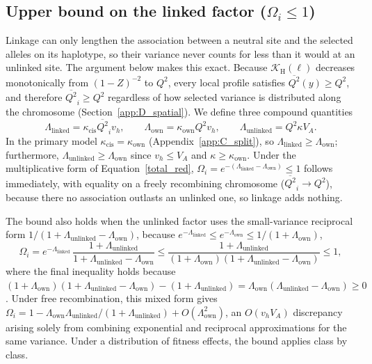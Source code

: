 \documentclass{article}
\begin{document}
\subsection{Upper bound on the linked factor (\texorpdfstring{$\Omega_i \le 1$}{Omega <= 1})}\label{app:omega}
Linkage can only lengthen the association between a neutral site and the selected alleles on its haplotype, so their variance never counts for less than it would at an unlinked site. The argument below makes this exact. Because $\mathcal{K}_\text{H}(\ell)$ decreases monotonically from $(1-Z)^{-2}$ to $Q^2$, every local profile satisfies $\overline{Q^2}(y) \ge Q^2$, and therefore $\overline{Q^2}_i \ge Q^2$ regardless of how selected variance is distributed along the chromosome (Section~\ref{app:D_spatial}). We define three compound quantities
\begin{equation}
    \Lambda_\text{linked} = \kappa_\text{cis}\overline{Q^2}_iv_h, \qquad \Lambda_\text{own} = \kappa_\text{own}Q^2v_h, \qquad \Lambda_\text{unlinked} = Q^2\kappa V_A.
\end{equation}
In the primary model $\kappa_\text{cis} = \kappa_\text{own}$ (Appendix~\ref{app:C_split}), so $\Lambda_\text{linked} \ge \Lambda_\text{own}$; furthermore, $\Lambda_\text{unlinked} \ge \Lambda_\text{own}$ since $v_h \le V_A$ and $\kappa \ge \kappa_\text{own}$. Under the multiplicative form of Equation~\eqref{total_red}, $\Omega_i = e^{-(\Lambda_\text{linked} - \Lambda_\text{own})} \le 1$ follows immediately, with equality on a freely recombining chromosome ($\overline{Q^2}_i \to Q^2$), because there no association outlasts an unlinked one, so linkage adds nothing.

The bound also holds when the unlinked factor uses the small-variance reciprocal form $1/(1 + \Lambda_\text{unlinked} - \Lambda_\text{own})$, because $e^{-\Lambda_\text{linked}} \le e^{-\Lambda_\text{own}} \le 1/(1+\Lambda_\text{own})$,
\begin{equation}
    \Omega_i = e^{-\Lambda_\text{linked}}\,\frac{1+\Lambda_\text{unlinked}}{1+\Lambda_\text{unlinked}-\Lambda_\text{own}} \le \frac{1+\Lambda_\text{unlinked}}{(1+\Lambda_\text{own})(1+\Lambda_\text{unlinked}-\Lambda_\text{own})} \le 1,
\end{equation}
where the final inequality holds because $(1+\Lambda_\text{own})(1+\Lambda_\text{unlinked}-\Lambda_\text{own}) - (1+\Lambda_\text{unlinked}) = \Lambda_\text{own}(\Lambda_\text{unlinked}-\Lambda_\text{own}) \ge 0$. Under free recombination, this mixed form gives $\Omega_i = 1 - \Lambda_\text{own}\Lambda_\text{unlinked}/(1 + \Lambda_\text{unlinked}) + O(\Lambda_\text{own}^2)$, an $O(v_h V_A)$ discrepancy arising solely from combining exponential and reciprocal approximations for the same variance. Under a distribution of fitness effects, the bound applies class by class.
\end{document}
